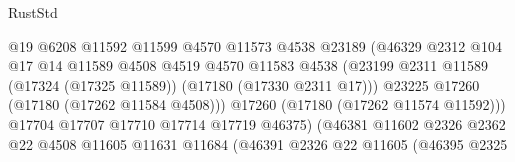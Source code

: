 \begin{lexlean}{RustStd}
\begin{coremodule}
                                            @19
                                            @6208
                                            @11592
                                            @11599
                                            @4570
                                            @11573
                                            @4538
                                            @23189
                                            (@46329
                                              @2312
                                              @104
                                              @17
                                              @14
                                              @11589
                                              @4508
                                              @4519
                                              @4570
                                              @11583
                                              @4538
                                              (@23199
                                                @2311
                                                @11589
                                                (@17324 (@17325 @11589))
                                                (@17180 (@17330 @2311 @17)))
                                              @23225
                                              @17260
                                              (@17180 (@17262 @11584 @4508)))
                                            @17260
                                            (@17180 (@17262 @11574 @11592)))
                                          @17704
                                          @17707
                                          @17710
                                          @17714
                                          @17719
                                          @46375)
                                        (@46381
                                          @11602
                                          @2326
                                          @2362
                                          @22
                                          @4508
                                          @11605
                                          @11631
                                          @11684
                                          (@46391
                                            @2326
                                            @22
                                            @11605
                                            (@46395
                                              @2325

\end{coremodule}
\end{lexlean}
